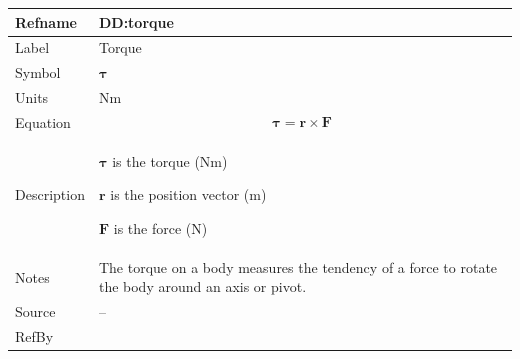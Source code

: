 \documentclass[12pt]{article}
\begin{document}
\vspace{\baselineskip}
\noindent
\begin{minipage}{\textwidth}
\begin{tabular}{>{\raggedright}p{}>{\raggedright\arraybackslash}p{}}
\toprule \textbf{Refname} & \textbf{DD:torque}
\label{DD:torque}
\\ \midrule
Label & Torque
        
\\ \midrule
Symbol & $\symbf{τ}$
         
\\ \midrule
Units & $\text{N}\text{m}$
        
\\ \midrule
Equation & \begin{displaymath}
           \symbf{τ}=\symbf{r}\times\symbf{F}
           \end{displaymath}
\\ \midrule
Description & \begin{symbDescription}
              \item{$\symbf{τ}$ is the torque ($\text{N}\text{m}$)}
              \item{$\symbf{r}$ is the position vector (${\text{m}}$)}
              \item{$\symbf{F}$ is the force (${\text{N}}$)}
              \end{symbDescription}
\\ \midrule
Notes & The torque on a body measures the tendency of a force to rotate the body around an axis or pivot.
        
\\ \midrule
Source & --
         
\\ \midrule
RefBy & 
\\ \bottomrule
\end{tabular}
\end{minipage}
\end{document}
